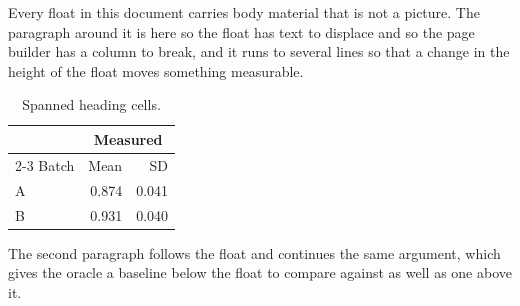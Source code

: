 \documentclass[12pt]{article}
\begin{document}
Every float in this document carries body material that is not a
picture. The paragraph around it is here so the float has text to displace and
so the page builder has a column to break, and it runs to several lines so that
a change in the height of the float moves something measurable.

\begin{table}[h]
\centering
\begin{tabular}{|l|r|r|}
\hline
& \multicolumn{2}{c|}{Measured} \\
\cline{2-3}
Batch & Mean & SD \\
\hline
A & 0.874 & 0.041 \\
B & 0.931 & 0.040 \\
\hline
\end{tabular}
\caption{Spanned heading cells.}
\end{table}

The second paragraph follows the float and continues the same
argument, which gives the oracle a baseline below the float to compare against
as well as one above it.
\end{document}
